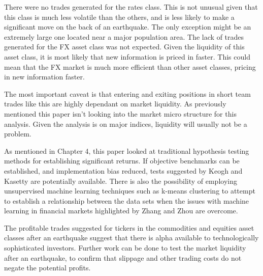 There were no trades generated for the rates class. This is not unusual given that this class is much less volatile than the others, and is less likely to make a significant move on the back of an earthquake. The only exception might be an extremely large one located near a major population area. The lack of trades generated for the FX asset class was not expected. Given the liquidity of this asset class, it is most likely that new information is priced in faster. This could mean that the FX market is much more efficient than other asset classes, pricing in new information faster.

The most important caveat is that entering and exiting positions in short team trades like this are highly dependant on market liquidity. As previously mentioned this paper isn't looking into the market micro structure for this analysis. Given the analysis is on major indices, liquidity will usually not be a problem.

As mentioned in Chapter 4, this paper looked at traditional hypothesis testing methods for establishing significant returns. If objective benchmarks can be established, and implementation bias reduced, tests suggested by Keogh and Kasetty\cite{data_mining_Keogh} are potentially available. There is also the possibility of employing unsupervised machine learning techniques such as k-means clustering to attempt to establish a relationship between the data sets when the issues with machine learning in financial markets highlighted by Zhang and Zhou\cite{golden_nuggets} are overcome.

The profitable trades suggested for tickers in the commodities and equities asset classes after an earthquake suggest that there is alpha available to technologically sophisticated investors. Further work can be done to test the market liquidity after an earthquake, to confirm that slippage and other trading costs do not negate the potential profits.



